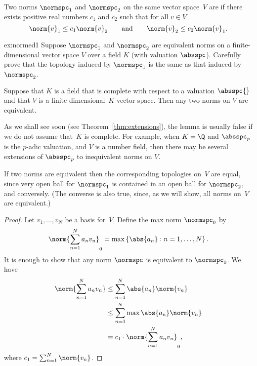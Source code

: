 \documentclass[11pt]{book}
\begin{document}
\begin{ch}
\begin{definition}[Equivalent]
  Two norms $\normspc_1$ and $\normspc_2$ on the same vector space~$V$
  are  if there exists positive real numbers $c_1$ and $c_2$
  such that for all $v\in V$
$$
  \norm{v}_1 \leq c_1 \norm{v}_2
  \qquad\text{and}\qquad
  \norm{v}_2 \leq c_2 \norm{v}_1.
$$
\end{definition}

\begin{exercise}{ex:normed1}
Suppose $\normspc_1$ and $\normspc_2$ are
equivalent norms on a finite-dimensional vector space
$V$ over a field $K$ (with valuation $\absspc$).
Carefully prove that the topology induced by $\normspc_1$
is the same as that induced by $\normspc_2$.
\end{exercise}


\begin{lemma}\label{lem:ext_unique}
Suppose that $K$ is a field that is complete with respect to a valuation
$\absspc{}$ and that $V$ is a finite dimensional~$K$ vector space.
Then any two norms on $V$ are equivalent.
\end{lemma}
\begin{remark}
  As we shall see soon (see Theorem~\ref{thm:extensions}), the lemma
  is usually false if we do not assume that~$K$ is complete.  For
  example, when $K=\Q$ and $\absspc_p$ is the $p$-adic valuation, and
  $V$ is a number field, then there may be several extensions of
  $\absspc_p$ to inequivalent norms on $V$.
\end{remark}
If two norms are equivalent then the corresponding topologies on~$V$
are equal, since very open ball for $\normspc_1$ is contained in an
open ball for $\normspc_2$, and conversely. (The converse is also
true, since, as we will show, all norms on~$V$ are equivalent.)
\begin{proof}
Let $v_1,\ldots, v_N$ be a basis for~$V$.  Define the max
norm $\normspc_0$ by
$$
\norm{\sum_{n=1}^N a_n v_n}_0 = \max \left\{\abs{a_n} : n=1,\ldots, N\right\}.
$$
It is enough to show that any norm $\normspc$ is equivalent to
$\normspc_0$.  We have
\begin{align*}
\norm{\sum_{n=1}^N a_n v_n} & \leq
    \sum_{n=1}^N \abs{a_n} \norm{v_n} \\
    &\leq \sum_{n=1}^N \max{\abs{a_n}} \norm{v_n}\\
    & = c_1 \cdot \norm{\sum_{n=1}^N a_n v_n}_0,
\end{align*}
where $c_1 = \sum_{n=1}^N \norm{v_n}$.


\end{proof}
\end{ch}
\end{document}
